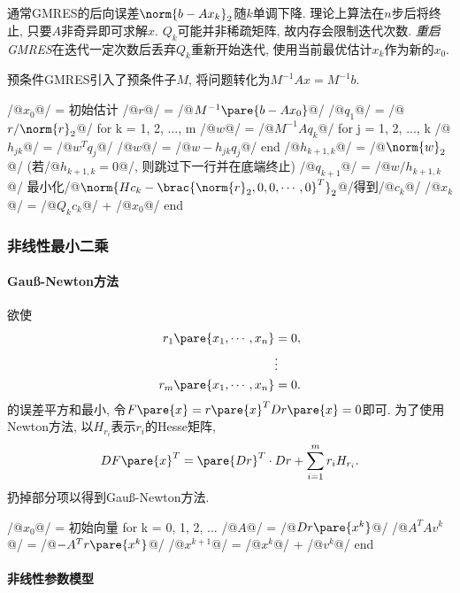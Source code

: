 \documentclass{ctexart}
\begin{document}
通常GMRES的后向误差$\norm{b-Ax_k}_2$随$k$单调下降. 理论上算法在$n$步后将终止, 只要$A$非奇异即可求解$x$. $Q_k$可能并非稀疏矩阵, 故内存会限制迭代次数. \emph{重启GMRES}在迭代一定次数后丢弃$Q_k$重新开始迭代, 使用当前最优估计$x_k$作为新的$x_0$.
\par
预条件GMRES引入了预条件子$M$, 将问题转化为$M^{-1}Ax = M^{-1}b$.
\begin{matlablst}
/@$x_0$@/ = 初始估计
/@$r$@/ = /@$M^{-1}\pare{b - Ax_0}$@/
/@$q_1$@/ = /@$r/\norm{r}_2$@/
for k = 1, 2, ..., m
    /@$w$@/ = /@$M^{-1}Aq_k$@/
    for j = 1, 2, ..., k
        /@$h_{jk}$@/ = /@$w^T q_j$@/
        /@$w$@/ = /@$w - h_{jk}q_j$@/
    end
    /@$h_{k+1,k}$@/ = /@$\norm{w}_2$@/ (若/@$h_{k+1,k} = 0$@/, 则跳过下一行并在底端终止)
    /@$q_{k+1}$@/ = /@$w/h_{k+1,k}$@/
    最小化/@$\norm{Hc_k - \brac{\norm{r}_2,0,0,\cdots,0}^T}_2$@/得到/@$c_k$@/
    /@$x_k$@/ = /@$Q_kc_k$@/ + /@$x_0$@/
end
\end{matlablst}


\subsubsection{非线性最小二乘} %
\label{ssub:非线性最小二乘}

\paragraph{Gau\ss-Newton方法} %
\label{par:gauss_newton方法}

欲使
\begin{align*}
    r_1\pare{x_1,\cdots,x_n} &= 0, \\
    & \vdots \\
    r_m\pare{x_1,\cdots,x_n} &= 0.
\end{align*}
的误差平方和最小, 令$F\pare{x} = r\pare{x}^TDr\pare{x} = 0$即可. 为了使用Newton方法, 以$H_{r_i}$表示$r_i$的Hesse矩阵,
\[ DF\pare{x}^T = \pare{Dr}^T \cdot Dr + \sum_{i=1}^m r_i H_{r_i}. \]
扔掉部分项以得到Gau\ss-Newton方法.
\begin{matlablst}
/@$x_0$@/ = 初始向量
for k = 0, 1, 2, ...
    /@$A$@/ = /@$Dr\pare{x^k}$@/
    /@$A^TAv^k$@/ = /@$-A^Tr\pare{x^k}$@/
    /@$x^{k+1}$@/ = /@$x^k$@/ + /@$v^k$@/
end
\end{matlablst}


\paragraph{非线性参数模型} %
\label{par:非线性参数模型}
\end{document}

